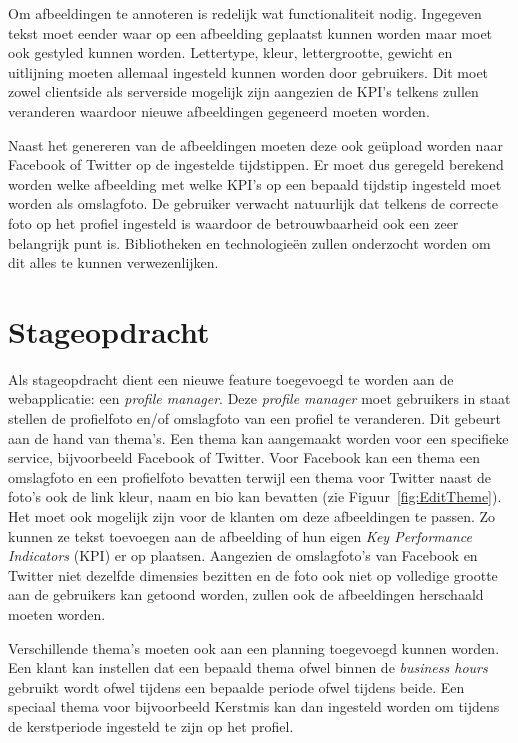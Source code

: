 Om afbeeldingen te annoteren is redelijk wat functionaliteit nodig. Ingegeven tekst moet eender waar op een afbeelding geplaatst kunnen worden maar moet ook gestyled kunnen worden. Lettertype, kleur, lettergrootte, gewicht en uitlijning moeten allemaal ingesteld kunnen worden door gebruikers. Dit moet zowel clientside als serverside mogelijk zijn aangezien de KPI's telkens zullen veranderen waardoor nieuwe afbeeldingen gegeneerd moeten worden. 

Naast het genereren van de afbeeldingen moeten deze ook ge\"{u}pload worden naar Facebook of Twitter op de ingestelde tijdstippen. Er moet dus geregeld berekend worden welke afbeelding met welke KPI's op een bepaald tijdstip ingesteld moet worden als omslagfoto. De gebruiker verwacht natuurlijk dat telkens de correcte foto op het profiel ingesteld is waardoor de betrouwbaarheid ook een zeer belangrijk punt is.
Bibliotheken en technologie\"{e}n zullen onderzocht worden om dit alles te kunnen verwezenlijken.



\iffalse
\chapter{Stageopdracht}
\vspace{-3cm}
Als stageopdracht dient een nieuwe feature toegevoegd te worden aan de webapplicatie: een \textit{profile manager}. Deze \textit{profile manager} moet gebruikers in staat stellen de profielfoto en/of omslagfoto van een profiel te veranderen. Dit gebeurt aan de hand van thema's. Een thema kan aangemaakt worden voor een specifieke service, bijvoorbeeld Facebook of Twitter. Voor Facebook kan een thema een omslagfoto en een profielfoto bevatten terwijl een thema voor Twitter naast de foto's ook de link kleur, naam en bio kan bevatten (zie Figuur~\ref{fig:EditTheme}). Het moet ook mogelijk zijn voor de klanten om deze afbeeldingen te passen. Zo kunnen ze tekst toevoegen aan de afbeelding of hun eigen \textit{Key Performance Indicators} (KPI) er op plaatsen. Aangezien de omslagfoto's van Facebook en Twitter niet dezelfde dimensies bezitten en de foto ook niet op volledige grootte aan de gebruikers kan getoond worden, zullen ook de afbeeldingen herschaald moeten worden.

Verschillende thema's moeten ook aan een planning toegevoegd kunnen worden. Een klant kan instellen dat een bepaald thema ofwel binnen de \textit{business hours} gebruikt wordt ofwel tijdens een bepaalde periode ofwel tijdens beide. Een speciaal thema voor bijvoorbeeld Kerstmis kan dan ingesteld worden om tijdens de kerstperiode ingesteld te zijn op het profiel. 


